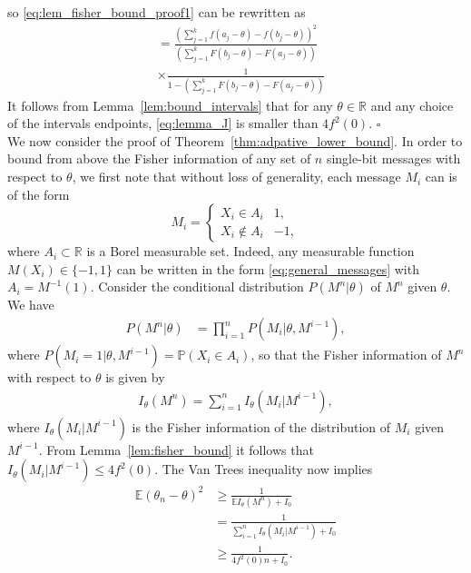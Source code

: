 \documentclass[letterpaper, conference, 11pt]{IEEEtran}      %
\newcommand*{\QEDA}{\hfill\ensuremath{\square}}
\begin{document}
so \eqref{eq:lem_fisher_bound_proof1} can be rewritten as
\begin{align}
& =   \frac { \left( \sum_{j=1}^{k} f \left(a_j-\theta \right) - f \left( b_j-\theta \right)  \right)^2 } 
{ \left( \sum_{j=1}^k F \left( b_j-\theta \right) - F \left( a_j-\theta \right)  \right) }  \nonumber \\
& \times \frac {1} 
{1- \left( \sum_{j=1}^k F \left(  b_j-\theta \right) - F \left( a_j-\theta \right)  \right) } 
\label{eq:lemma_J}
\end{align}
It follows from Lemma~\ref{lem:bound_intervals} that for any $\theta \in \mathbb R$ and any choice of the intervals endpoints, \eqref{eq:lemma_J} is smaller than $4f^2(0)$.  \QEDA \\

We now consider the proof of Theorem~\ref{thm:adpative_lower_bound}. In order to bound from above the Fisher information of any set of $n$ single-bit messages with respect to $\theta$, we first note that without loss of generality, each message $M_i$ can is of the form
\begin{equation}
\label{eq:general_messages}
M_i = \begin{cases}
X_i \in A_i & 1, \\
X_i \notin A_i & -1,
\end{cases} 
\end{equation}
where $A_i \subset \mathbb R$ is a Borel measurable set. Indeed, any measurable function $M(X_i) \in \{-1,1\}$ can be written in the form \eqref{eq:general_messages} with $A_i = M^{-1}(1)$. Consider the conditional distribution $P({M^n|\theta})$ of $M^n$ given $\theta$. We have 
\begin{align}
P\left( M^n | \theta \right) & =  \prod_{i=1}^n P\left(M_i | \theta, M^{i-1} \right), \label{eq:adpt_lower_bound_proof:1}
\end{align}
where $P\left(M_i =1 | \theta, M^{i-1}  \right) = \mathbb P\left( X_i \in A_i\right)$, so that the Fisher information of $M^n$ with respect to $\theta$ is given by 
\begin{align}
I_\theta(M^n) = \sum_{i=1}^n I_\theta (M_i|M^{i-1}),
\label{eq:fisher_information}
\end{align}
where $I_\theta (M_i|M^{i-1})$ is the Fisher information of the distribution of $M_i$ given $M^{i-1}$. From Lemma~\ref{lem:fisher_bound} it follows that $I_\theta (M_i|M^{i-1}) \leq 4f^2(0)$. The Van Trees inequality \cite{van2004detection, gill1995applications} now implies 
\begin{align*}
\mathbb E \left( \theta_n - \theta \right)^2 &  \geq \frac{1}{ \mathbb E I_\theta(M^n) + I_0} \\
& = \frac{1}{ \sum_{i=1}^n I_\theta (M_i | M^{i-1} ) + I_0} \\
& \geq \frac{1}{ 4f^2(0) n + I_0}.
\end{align*}
\end{document}
